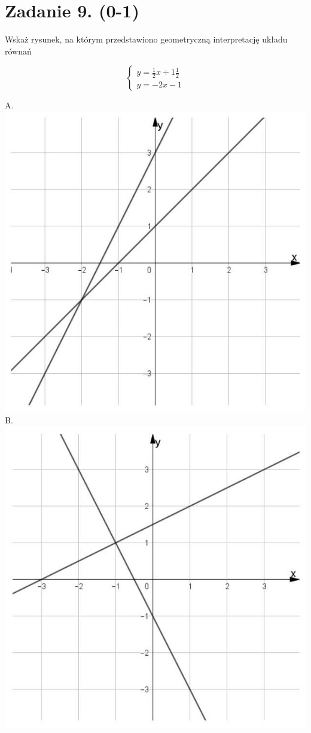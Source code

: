 \documentclass[10pt]{article}
\begin{document}
\section*{Zadanie 9. (0-1)}
Wskaż rysunek, na którym przedstawiono geometryczną interpretację układu równań

\[
\left\{\begin{array}{l}
y=\frac{1}{2} x+1 \frac{1}{2} \\
y=-2 x-1
\end{array}\right.
\]

A.\\
\includegraphics[max width=\textwidth, center]{2024_11_21_fd555512e32c497e8a5dg-04}\\
B.\\
\includegraphics[max width=\textwidth, center]{2024_11_21_fd555512e32c497e8a5dg-04(1)}\\
\end{document}
